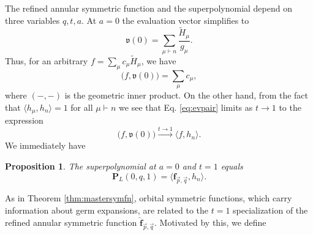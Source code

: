 \documentclass{amsart}
\numberwithin{equation}{section}
\newtheorem{proposition}[lemma]{Proposition}%
\theoremstyle{definition}
\def\hat{\widehat}
\newcommand{\tH}{\widetilde{H}}
\newcommand{\frs}{\mathbf{f}_{\vec{p},\vec{q}}}
\newcommand{\fv}{\mathfrak{v}}
\newcommand{\fqrs}{\hat{\mathbf{f}}_{\vec{p},\vec{q}}}
\begin{document}
The refined annular symmetric function and the superpolynomial depend on three variables $q,t,a$.
 At $a=0$ the evaluation vector simplifies to 
$$\fv(0)=\sum_{\mu\vdash n}\frac{\tH_\mu}{g_\mu}.$$
Thus, for an arbitrary $f=\sum_\mu c_\mu \tH_\mu$, we have
\begin{equation}
\label{eq:evpair}
\bigl(f, \fv(0)\bigr)=\sum_\mu c_\mu,
\end{equation}
where $(-,-)$ is the geometric inner product. On the other hand, from the fact that $\langle h_\mu,h_n\rangle=1$ for all $\mu\vdash n$ we see that Eq. \eqref{eq:evpair} limits as $t\to 1$ to the expression 
\begin{equation}
\label{eq:limevpair}
\bigl(f, \fv(0)\bigr)\xrightarrow{t\to 1} \langle f, h_n\rangle.
\end{equation}
We immediately have
\begin{proposition}
The superpolynomial at $a=0$ and $t=1$ equals
$$\mathbf{P}_L(0,q,1)=\langle \frs, h_n\rangle.$$
\end{proposition}


As in Theorem \ref{thm:mastersymfn}, orbital symmetric functions, which carry information about germ expansions,
are related to the $t=1$ specialization of the refined annular symmetric function $\fqrs$. 
Motivated by this, we define
\end{document}
